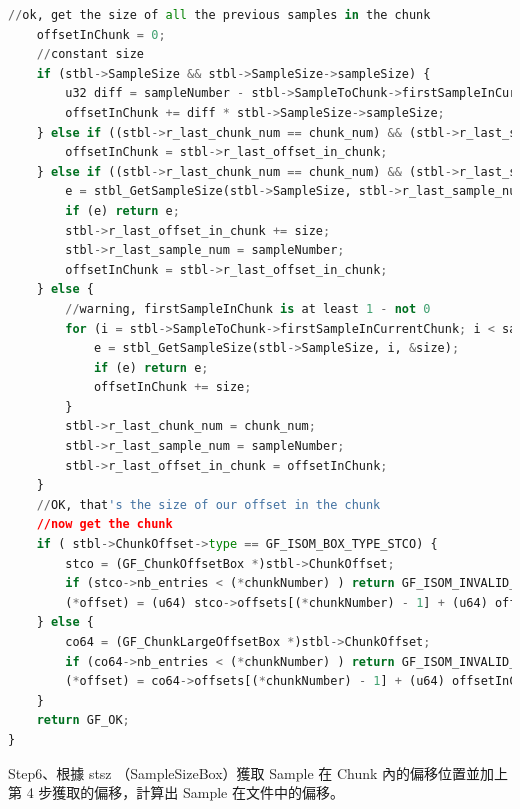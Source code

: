 \documentclass[10pt,UTF8]{ctexart}
\begin{document}
\begin{lstlisting}[language={python}]
	//ok, get the size of all the previous samples in the chunk
	offsetInChunk = 0;
	//constant size
	if (stbl->SampleSize && stbl->SampleSize->sampleSize) {
		u32 diff = sampleNumber - stbl->SampleToChunk->firstSampleInCurrentChunk;
		offsetInChunk += diff * stbl->SampleSize->sampleSize;
	} else if ((stbl->r_last_chunk_num == chunk_num) && (stbl->r_last_sample_num == sampleNumber)) {
		offsetInChunk = stbl->r_last_offset_in_chunk;
	} else if ((stbl->r_last_chunk_num == chunk_num) && (stbl->r_last_sample_num + 1 == sampleNumber)) {
		e = stbl_GetSampleSize(stbl->SampleSize, stbl->r_last_sample_num, &size);
		if (e) return e;
		stbl->r_last_offset_in_chunk += size;
		stbl->r_last_sample_num = sampleNumber;
		offsetInChunk = stbl->r_last_offset_in_chunk;
	} else {
		//warning, firstSampleInChunk is at least 1 - not 0
		for (i = stbl->SampleToChunk->firstSampleInCurrentChunk; i < sampleNumber; i++) {
			e = stbl_GetSampleSize(stbl->SampleSize, i, &size);
			if (e) return e;
			offsetInChunk += size;
		}
		stbl->r_last_chunk_num = chunk_num;
		stbl->r_last_sample_num = sampleNumber;
		stbl->r_last_offset_in_chunk = offsetInChunk;
	}
	//OK, that's the size of our offset in the chunk
	//now get the chunk
	if ( stbl->ChunkOffset->type == GF_ISOM_BOX_TYPE_STCO) {
		stco = (GF_ChunkOffsetBox *)stbl->ChunkOffset;
		if (stco->nb_entries < (*chunkNumber) ) return GF_ISOM_INVALID_FILE;
		(*offset) = (u64) stco->offsets[(*chunkNumber) - 1] + (u64) offsetInChunk;
	} else {
		co64 = (GF_ChunkLargeOffsetBox *)stbl->ChunkOffset;
		if (co64->nb_entries < (*chunkNumber) ) return GF_ISOM_INVALID_FILE;
		(*offset) = co64->offsets[(*chunkNumber) - 1] + (u64) offsetInChunk;
	}
	return GF_OK;
}
\end{lstlisting}

Step6、根據 stsz （SampleSizeBox）獲取 Sample 在 Chunk 內的偏移位置並加上第 4 步獲取的偏移，計算出 Sample 在⽂件中的偏移。
\end{document}
